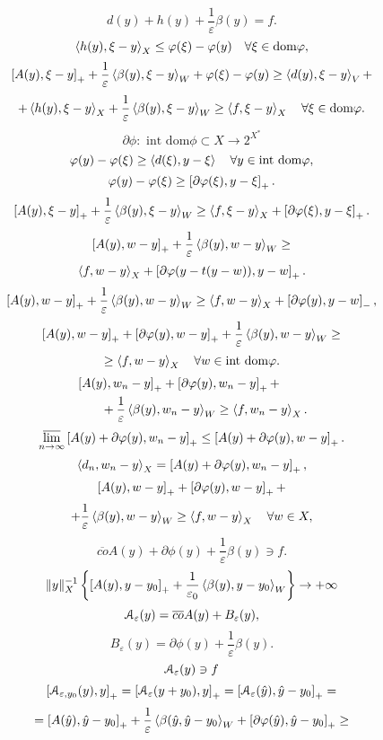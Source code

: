 \documentclass[12pt]{book} %
\let\epsilon\varepsilon
\begin{document}
\[d(y)+h(y)+\frac{1}{\epsilon}\beta(y)=f.\]
\[\left<h(y),\xi-y\right>_X\leq\varphi(\xi)-\varphi(y)\quad\forall\xi\in\mbox{dom}\varphi,\]
\[\mysbra{A(y),\xi-y}_++\frac{1}{\epsilon}\mysca{\beta(y)}{\xi-y}_W+\phi(\xi)-\phi(y)\geq\mysca{d(y)}{\xi-y}_V+\]
\[+\mysca{h(y)}{\xi-y}_X+\frac{1}{\epsilon}\mysca{\beta(y)}{\xi-y}_W\geq\mysca{f}{\xi-y}_X\quad\forall\xi\in\mbox{dom}\phi.\]
\[\partial\phi:\mbox{ int dom}\phi\subset X\to 2^{X^*}\]
\[\varphi(y)-\varphi(\xi)\geq\left<d(\xi),y-\xi\right>\quad\forall y\in\mbox{int dom}\varphi,\]
\[\varphi(y)-\varphi(\xi)\geq\left[\partial\varphi(\xi),y-\xi\right]_+.\]
\[\mysbra{A(y),\xi-y}_++\frac{1}{\epsilon}\mysca{\beta(y)}{\xi-y}_W\geq\mysca{f}{\xi-y}_X+\mysbra{\partial\phi(\xi),y-\xi}_+.\]
\[\mysbra{A(y),w-y}_++\frac{1}{\epsilon}\mysca{\beta(y)}{w-y}_W\geq\]
\[\left<f,w-y\right>_X+\left[\partial\varphi(y-t(y-w)),y-w\right]_+.\]
\[\mysbra{A(y),w-y}_++\frac{1}{\epsilon}\mysca{\beta(y)}{w-y}_W\geq\mysca{f}{w-y}_X+\mysbra{\partial\phi(y),y-w}_-,\]
\[\mysbra{A(y),w-y}_++\mysbra{\partial\phi(y),w-y}_++\frac{1}{\epsilon}\mysca{\beta(y)}{w-y}_W\geq\]
\begin{equation}\geq\left<f,w-y\right>_X\quad\forall w\in\mbox{int dom}\varphi.\end{equation}
\begin{equation}\begin{aligned}
	&\mysbra{A(y),w_n-y}_++\mysbra{\partial\phi(y),w_n-y}_++\\
	&\qquad+\frac{1}{\epsilon}\mysca{\beta(y)}{w_n-y}_W\geq\mysca{f}{w_n-y}_X.
\end{aligned}\end{equation}
\[\varlimsup_{n\to\infty}\left[A(y)+\partial\varphi(y),w_n-y\right]_+\leq\left[A(y)+\partial\varphi(y),w-y\right]_+.\]
\[\left<d_n,w_n-y\right>_X=\left[A(y)+\partial\varphi(y),w_n-y\right]_+,\]
\[\left[A(y),w-y\right]_++\left[\partial\varphi(y),w-y\right]_++\]
\[+\frac{1}{\epsilon}\mysca{\beta(y)}{w-y}_W\geq\mysca{f}{w-y}_X\quad\forall w\in X,\]
\[\overline{co}A(y)+\partial\phi(y)+\frac{1}{\epsilon}\beta(y)\ni f.\]
\begin{equation}\mynorm{y}_X^{-1}\mycbra{\mysbra{A(y),y-y_0}_++\frac{1}{\epsilon_0}\mysca{\beta(y)}{y-y_0}_W}\to+\infty\end{equation}
\newcommand{\A}{\EuScript{A}}
\[\A_\epsilon(y)=\overline{co}A(y)+B_\epsilon(y),\]
\[B_\epsilon(y)=\partial\phi(y)+\frac{1}{\epsilon}\beta(y).\]
\begin{equation}\A_\epsilon(y)\ni f\end{equation}
\[\mysbra{\A_{\epsilon,y_0}(y),y}_+=\mysbra{\A_\epsilon(y+y_0),y}_+=\mysbra{\A_\epsilon(\hat{y}),\hat{y}-y_0}_+=\]
\[=\mysbra{A(\hat{y}),\hat{y}-y_0}_++\frac{1}{\epsilon}\mysca{\beta(\hat{y}}{\hat{y}-y_0}_W+\mysbra{\partial\phi(\hat{y}),\hat{y}-y_0}_+\geq\]
\end{document}
